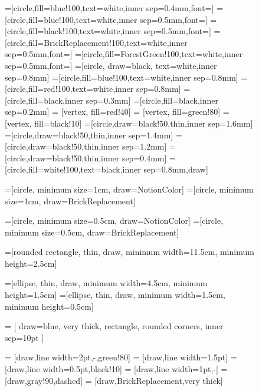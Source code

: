 \documentclass{article}
\begin{document}
\begin{figure}[ht]
	\begin{center}
		=[circle,fill=blue!100,text=white,inner sep=0.4mm,font=\scriptsize]
		=[circle,fill=blue!100,text=white,inner sep=0.5mm,font=\small]
		=[circle,fill=black!100,text=white,inner sep=0.5mm,font=\small]
		=[circle,fill=BrickReplacement!100,text=white,inner sep=0.5mm,font=\small]
		=[circle,fill=ForestGreen!100,text=white,inner sep=0.5mm,font=\small]
		=[circle, draw=black, text=white,inner sep=0.8mm]
		=[circle,fill=blue!100,text=white,inner sep=0.8mm]
		=[circle,fill=red!100,text=white,inner sep=0.8mm]
		=[circle,fill=black,inner sep=0.3mm]
		=[circle,fill=black,inner sep=0.2mm]
		 = [vertex, fill=red!40]
		 = [vertex, fill=green!80]
		 = [vertex, fill=black!10]
		=[circle,draw=black!50,thin,inner sep=1.6mm]
		=[circle,draw=black!50,thin,inner sep=1.4mm]
		=[circle,draw=black!50,thin,inner sep=1.2mm]
		=[circle,draw=black!50,thin,inner sep=0.4mm]
		=[circle,fill=white!100,text=black,inner sep=0.8mm,draw]
		
		=[circle, minimum size=1cm, draw=NotionColor]
		=[circle, minimum size=1cm, draw=BrickReplacement]
		
		=[circle, minimum size=0.5cm, draw=NotionColor]
		=[circle, minimum size=0.5cm, draw=BrickReplacement]
		
		=[rounded rectangle, thin, draw, minimum width=11.5cm, minimum height=2.5cm]
		
		
		
		=[ellipse, thin, draw, minimum width=4.5cm, minimum height=1.5cm]
		=[ellipse, thin, draw, minimum width=1.5cm, minimum height=0.5cm]
		
		 = [
		draw=blue, very thick,
		rectangle, rounded corners,
		inner sep=10pt
		]
		
		 = [draw,line width=2pt,-,green!80]
		 = [draw,line width=1.5pt]
		 = [draw,line width=0.5pt,black!10]
		 = [draw,line width=1pt,-]
		 = [draw,gray!90,dashed]
		 = [draw,BrickReplacement,very thick]
		

\end{center}
\end{figure}
\end{document}

